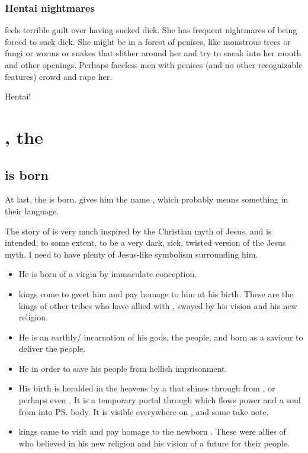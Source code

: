 \subsubsection{Hentai nightmares}
\Ilu{} feels terrible guilt over having sucked dick. She has frequent nightmares of being forced to suck dick. She might be in a forest of penises, like monstrous trees or fungi or worms or snakes that slither around her and try to sneak into her mouth and other openings. Perhaps faceless men with penises (and no other recognizable \nephilic{} features) crowd and rape her.

Hentai!















\section{\Thanatzil{}, the \BaneMessiah}
\subsection{\Thanatzil{} is born}
At last, the \banemessiah{} is born. \Semiza{} gives him the name , which probably means something in their language. 

The story of \Thanatzil{} is very much inspired by the Christian myth of Jesus, and is intended, to some extent, to be a very dark, sick, twisted version of the Jesus myth. I need to have plenty of Jesus-like symbolism surrounding him.

\begin{itemize}
  \item 
    He is born of a virgin by immaculate conception.
  \item 
    \Nephilic{} kings come to greet him and pay homage to him at his birth. These are the kings of other tribes who have allied with \Semiza, swayed by his vision and his new religion. 
  \item
    He is an earthly/\Miithian{} incarnation of his gods, the \bane{} people, and born as a saviour to deliver the \nephilic{} people. 
  \item
    He  in order to save his people from hellish imprisonment. 
  \item 
    His birth is heralded in the heavens by a  that shines through from \Nyx, or perhaps even \Erebos. It is a temporary portal through which flows power and a \bane{} soul from \Nyx{} into \ps{\Thanatzil}{} body. It is visible everywhere on \Miith{}, and some \dragons{} take note.
  \item
    \Nephilic{} kings came to visit and pay homage to the newborn \Thanatzil. These were allies of \Semiza{} who believed in his new religion and his vision of a future for their people. 
\end{itemize}






